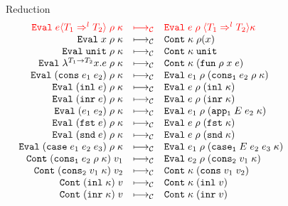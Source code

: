 \documentclass[acmsmall,review,anonymous]{acmart}\settopmatter{printfolios=true,printccs=false,printacmref=false}
\newcommand{\sOOinspect}[3]{\mathtt{Eval} \; #1 \; #2 \; #3}
\newcommand{\sOOreturn}[2]{\mathtt{Cont} \; #2 \; #1}
\newcommand{\eOOvar}[1]{#1}
\newcommand{\eOOsole}[0]{\mathtt{unit}}
\newcommand{\eOOlam}[4]{\lambda^{#1\rightarrow{}#2}#3.#4}
\newcommand{\eOOapp}[2]{#1 \; #2}
\newcommand{\eOOcons}[2]{\mathtt{cons} \; #1 \; #2}
\newcommand{\eOOcar}[1]{\mathtt{fst} \; #1}
\newcommand{\eOOcdr}[1]{\mathtt{snd} \; #1}
\newcommand{\eOOinl}[1]{\mathtt{inl} \; #1}
\newcommand{\eOOinr}[1]{\mathtt{inr} \; #1}
\newcommand{\eOOcase}[3]{\mathtt{case} \; #1 \; #2 \; #3}
\newcommand{\eOOcast}[4]{#1 \langle \cOOcast{#2}{#3}{#4} \rangle}
\newcommand{\cOOcast}[3]{#1 \Rightarrow^{#2} #3}
\newcommand{\vOOfun}[3]{\mathtt{fun} \; #1 \; #2 \; #3}
\newcommand{\vOOtt}[0]{\mathtt{unit}}
\newcommand{\vOOcons}[2]{\mathtt{cons}\;#1\;#2}
\newcommand{\vOOinl}[1]{\mathtt{inl}\;#1}
\newcommand{\vOOinr}[1]{\mathtt{inr}\;#1}
\newcommand{\kOOconsI}[3]{\mathtt{cons_1} \; #1 \; #2 \; #3}
\newcommand{\kOOconsII}[2]{\mathtt{cons_2} \; #1 \; #2}
\newcommand{\kOOinl}[1]{\mathtt{inl} \; #1}
\newcommand{\kOOinr}[1]{\mathtt{inr} \; #1}
\newcommand{\kOOappI}[3]{
	\mathtt{app_1} \; #1 \; #2 \; #3
}
\newcommand{\kOOcar}[1]{
	\mathtt{fst} \; #1}
\newcommand{\kOOcdr}[1]{
	\mathtt{snd} \; #1}
\newcommand{\kOOcaseI}[4]{
	\mathtt{case_1} \; #1 \; #2 \; #3 \; #4}
\newcommand{\judgeCreduce}[2]{#1 \longmapsto_{\mathcal{C}} #2}
\newcommand{\redrule}[3]{#1 & \longmapsto_\mathcal{C} & #2 & #3\\}
\newcommand{\hiredrule}[3]{\highlight{#1} & \highlight{\longmapsto_\mathcal{C}} & \highlight{#2} & \highlight{#3} \\}
\newcommand{\highlight}[1]{{\color{red} #1}}
\begin{document}
\begin{figure}
	
	\[
	\begin{array}{rclr}
	\end{array}
	\]
	
	Reduction \fbox{$ \judgeCreduce{s}{s} $}
	\[
	\begin{array}{rclr}
		\hiredrule{
		\sOOinspect{\eOOcast{e}{T_1}{l}{T_2}}{\rho}{\kappa}
	}{
		\sOOinspect{e}{\rho}{\langle\cOOcast{T_1}{l}{T_2}\rangle\kappa}
	}{}
	\redrule{
		\sOOinspect{\eOOvar{x}}{\rho}{\kappa}
	}{	
		\sOOreturn{\rho(x)}{\kappa}
	}{}
	\redrule{
		\sOOinspect{\eOOsole}{\rho}{\kappa}
	}{
		\sOOreturn{\vOOtt}{\kappa}
	}{}
	\redrule{
		\sOOinspect{\eOOlam{T_1}{T_2}{x}{e}}{\rho}{\kappa}
	}{
		\sOOreturn{(\vOOfun{\rho}{x}{e})}{\kappa}
	}{}
	\redrule{
		\sOOinspect{(\eOOcons{e_1}{e_2})}{\rho}{\kappa}
	}{
		\sOOinspect{e_1}{\rho}{(\kOOconsI{e_2}{\rho}{\kappa})}
	}{}
	\redrule{
		\sOOinspect{(\eOOinl{e})}{\rho}{\kappa}
	}{
		\sOOinspect{e}{\rho}{(\kOOinl{\kappa})}
	}{}
	\redrule{
	\sOOinspect{(\eOOinr{e})}{\rho}{\kappa}
	}{
	\sOOinspect{e}{\rho}{(\kOOinr{\kappa})}
	}{}
	\redrule{
		\sOOinspect{(\eOOapp{e_1}{e_2})}{\rho}{\kappa}
	}{
\sOOinspect{e_1}{\rho}{(\kOOappI{E}{e_2}{\kappa})}}{}

\redrule{
\sOOinspect{(\eOOcar{e})}{\rho}{\kappa}}{
\sOOinspect{e}{\rho}{(\kOOcar{\kappa})}}{}

\redrule{
	\sOOinspect{(\eOOcdr{e})}{\rho}{\kappa}}{
	\sOOinspect{e}{\rho}{(\kOOcdr{\kappa})}}{}

\redrule{
\sOOinspect{(\eOOcase{e_1}{e_2}{e_3})}{\rho}{\kappa}}{
\sOOinspect{e_1}{\rho}{(\kOOcaseI{E}{e_2}{e_3}{\kappa})}}{}

\redrule{
\sOOreturn{v_1}{(\kOOconsI{e_2}{\rho}{\kappa})}}{
\sOOinspect{e_2}{\rho}{(\kOOconsII{v_1}{\kappa})}}{}

\redrule{
\sOOreturn{v_2}{(\kOOconsII{v_1}{\kappa})}}{
\sOOreturn{(\vOOcons{v_1}{v_2})}{\kappa}}{}

\redrule{
\sOOreturn{v}{(\kOOinl{\kappa})}}{
\sOOreturn{(\vOOinl{v})}{\kappa}}{}

\redrule{
\sOOreturn{v}{(\kOOinr{\kappa})}}{
\sOOreturn{(\vOOinr{v})}{\kappa}}{}


\end{array}\]
\end{figure}
\end{document}
